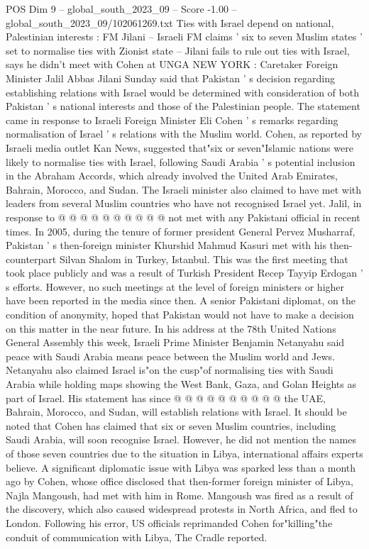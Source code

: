 \begin{textsample}{POS Dim 9 – global\_south\_2023\_09 – Score -1.00 – global\_south\_2023\_09/102061269.txt}  \label{ex:f9_pos_432}
Ties with Israel depend on national, Palestinian interests : FM Jilani -- Israeli FM claims ' six to seven Muslim states ' set to normalise ties with Zionist state -- Jilani fails to rule out ties with Israel, says he didn't meet with Cohen at UNGA NEW YORK : Caretaker Foreign Minister Jalil Abbas Jilani Sunday said that Pakistan ' s decision regarding establishing relations with Israel would be determined with consideration of both Pakistan ' s national interests and those of the Palestinian people.
The statement came in response to Israeli Foreign Minister Eli Cohen ' s remarks regarding normalisation of Israel ' s relations with the Muslim world.
Cohen, as reported by Israeli media outlet Kan News, suggested that"six or seven"Islamic nations were likely to normalise ties with Israel, following Saudi Arabia ' s potential inclusion in the Abraham Accords, which already involved the United Arab Emirates, Bahrain, Morocco, and Sudan.
The Israeli minister also claimed to have met with leaders from several Muslim countries who have not recognised Israel yet.
Jalil, in response to @ @ @ @ @ @ @ @ @ @ not met with any Pakistani official in recent times.
In 2005, during the tenure of former president General Pervez Musharraf, Pakistan ' s then-foreign minister Khurshid Mahmud Kasuri met with his then-counterpart Silvan Shalom in Turkey, Istanbul.
This was the first meeting that took place publicly and was a result of Turkish President Recep Tayyip Erdogan ' s efforts.
However, no such meetings at the level of foreign ministers or higher have been reported in the media since then.
A senior Pakistani diplomat, on the condition of anonymity, hoped that Pakistan would not have to make a decision on this matter in the near future.
In his address at the 78th United Nations General Assembly this week, Israeli Prime Minister Benjamin Netanyahu said peace with Saudi Arabia means peace between the Muslim world and Jews.
Netanyahu also claimed Israel is"on the cusp"of normalising ties with Saudi Arabia while holding maps showing the West Bank, Gaza, and Golan Heights as part of Israel.
His statement has since @ @ @ @ @ @ @ @ @ @ the UAE, Bahrain, Morocco, and Sudan, will establish relations with Israel.
It should be noted that Cohen has claimed that six or seven Muslim countries, including Saudi Arabia, will soon recognise Israel.
However, he did not mention the names of those seven countries due to the situation in Libya, international affairs experts believe.
A significant diplomatic issue with Libya was sparked less than a month ago by Cohen, whose office disclosed that then-former foreign minister of Libya, Najla Mangoush, had met with him in Rome.
Mangoush was fired as a result of the discovery, which also caused widespread protests in North Africa, and fled to London.
Following his error, US officials reprimanded Cohen for"killing"the conduit of communication with Libya, The Cradle reported.

\end{textsample}
